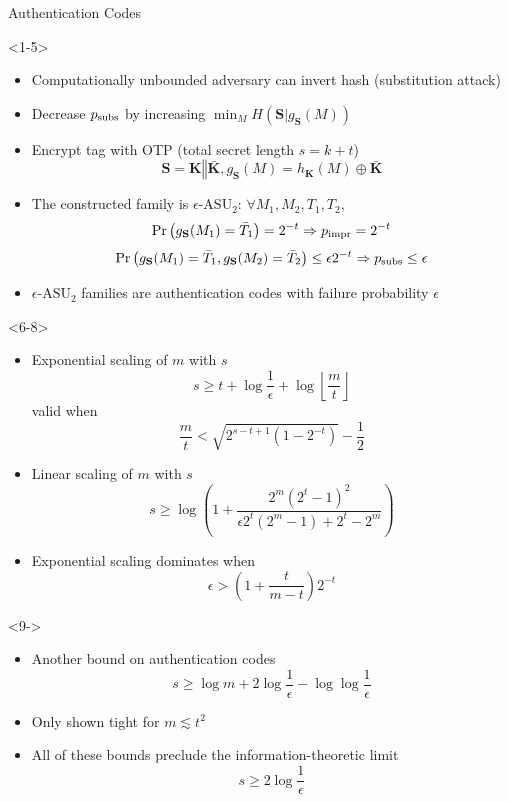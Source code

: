 \documentclass[xcolor=dvipsnames]{beamer}
\newcommand{\concat}{\mathbin{\Vert}} %
\newcommand{\?}{\mathrel{?}} %
\newcommand{\floor}[1]{\left\lfloor#1\right\rfloor} %
\newcommand{\rv}[1]{\boldsymbol{\mathbf{#1}}} %
\newcommand{\psubs}{p_{\rm subs}}
\newcommand{\pimpr}{p_{\rm impr}}
\newcommand{\ASU}{\mathrm{ASU}_{2}}
\newcommand{\eASU}{\epsilon\text{-}\ASU}
\begin{document}
\begin{frame}{Authentication Codes}
  \begin{onlyenv}<1-5>
    \begin{itemize}[<+->]
      \item Computationally unbounded adversary can invert hash (substitution attack)
      \item Decrease \(\psubs\) by increasing \( \min_M H(\rv{S}|g_{\rv{S}}(M))\)
      \item Encrypt tag with OTP (total secret length \(s = k + t\))
        \[ \rv{S} = \rv{K} \concat \bar{\rv{K}}, g_{\rv{S}}(M) = h_{\rv{K}}(M) \oplus \bar{\rv{K}} \]
      \item The constructed family is \(\eASU\): \(\forall M_1, M_2, T_1, T_2\),
        \[ \Pr\left( g_{\rv{S}}(M_1) = \bar{T}_1 \right) = 2^{-t} \Rightarrow \pimpr = 2^{-t} \]
        \[ \Pr\left( g_{\rv{S}}(M_1) = \bar{T}_1, g_{\rv{S}}(M_2) = \bar{T}_2 \right) \leq \epsilon 2^{-t} \Rightarrow \psubs \leq \epsilon \]
      \item \(\eASU\) families are authentication codes with failure probability \(\epsilon\)
    \end{itemize}
  \end{onlyenv}
  \begin{onlyenv}<6-8>
    \begin{itemize}[<+->]
      \item Exponential scaling of \(m\) with \(s\)
        \[ s \geq t + \log \frac{1}{\epsilon} + \log \floor{\frac{m}{t}} \]
        valid when
        \[ \frac{m}{t} < \sqrt{2^{s-t+1} \left(1-2^{-t}\right)} - \frac{1}{2} \]
      \item Linear scaling of \(m\) with \(s\)
        \[
          s \geq \log \left( 1 + \frac{2^{m}{(2^{t}-1)}^2}{\epsilon2^{t}(2^{m}-1) + 2^{t}-2^{m}} \right)
        \]
      \item Exponential scaling dominates when 
        \[ \epsilon > \left(1 + \frac{t}{m - t}\right) 2^{-t} \]
    \end{itemize}
  \end{onlyenv}
  \begin{onlyenv}<9->
    \begin{itemize}[<+->]
      \item Another bound on authentication codes
        \[ s \geq \log m + 2 \log \frac{1}{\epsilon} - \log \log \frac{1}{\epsilon} \]
      \item Only shown tight for \(m \lesssim t^2\)
      \item All of these bounds preclude the information-theoretic limit
        \[ s \geq 2 \log \frac{1}{\epsilon} \]
    \end{itemize}
  \end{onlyenv}
\end{frame}
\end{document}
